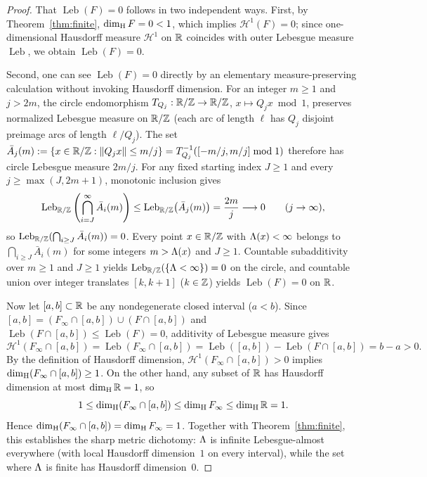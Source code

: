 \begin{proof}
That $\operatorname{Leb}(F)=0$ follows in two independent ways. First, by
Theorem~\ref{thm:finite}, $\dim_{\mathrm{H}} F=0<1$, which implies $\mathcal H^1(F)=0$;
since one-dimensional Hausdorff measure $\mathcal H^1$ on $\mathbb{R}$ coincides with
outer Lebesgue measure $\operatorname{Leb}$, we obtain $\operatorname{Leb}(F)=0$.

Second, one can see $\operatorname{Leb}(F)=0$ directly by an elementary
measure-preserving calculation without invoking Hausdorff dimension. For an
integer $m\ge1$ and $j>2m$, the circle endomorphism $T_{Q_j}:\mathbb{R}/\mathbb{Z}\to\mathbb{R}/\mathbb{Z}$,
$x\mapsto Q_jx\bmod1$, preserves normalized Lebesgue measure on $\mathbb{R}/\mathbb{Z}$ (each
arc of length $\ell$ has $Q_j$ disjoint preimage arcs of length $\ell/Q_j$).
The set $\bar A_j(m):=\{x\in\mathbb{R}/\mathbb{Z}:\|Q_jx\|\le m/j\}=T_{Q_j}^{-1}([-m/j,m/j]\bmod1)$
therefore has circle Lebesgue measure $2m/j$. For any fixed starting index
$J\ge1$ and every $j\ge\max(J,2m+1)$, monotonic inclusion gives
\[
\operatorname{Leb}_{\mathbb{R}/\mathbb{Z}}\left(\bigcap_{i=J}^\infty \bar A_i(m)\right)
\le\operatorname{Leb}_{\mathbb{R}/\mathbb{Z}}\bigl(\bar A_j(m)\bigr)=\frac{2m}{j}\longrightarrow0
\qquad(j\to\infty),
\]
so $\operatorname{Leb}_{\mathbb{R}/\mathbb{Z}}(\bigcap_{i\ge J}\bar A_i(m))=0$. Every point
$x\in\mathbb{R}/\mathbb{Z}$ with $\Lambda(x)<\infty$ belongs to $\bigcap_{i\ge J}\bar A_i(m)$ for
some integers $m>\Lambda(x)$ and $J\ge1$. Countable subadditivity over $m\ge1$ and
$J\ge1$ yields $\operatorname{Leb}_{\mathbb{R}/\mathbb{Z}}(\{\Lambda<\infty\})=0$ on the circle,
and countable union over integer translates $[k,k+1]$ ($k\in\mathbb{Z}$) yields
$\operatorname{Leb}(F)=0$ on $\mathbb{R}$.

Now let $[a,b]\subset\mathbb{R}$ be any nondegenerate closed interval ($a<b$). Since
$[a,b]=(F_\infty\cap[a,b])\cup(F\cap[a,b])$ and $\operatorname{Leb}(F\cap[a,b])\le\operatorname{Leb}(F)=0$,
additivity of Lebesgue measure gives
\[
\mathcal H^1(F_\infty\cap[a,b])=\operatorname{Leb}(F_\infty\cap[a,b])
=\operatorname{Leb}([a,b])-\operatorname{Leb}(F\cap[a,b])=b-a>0.
\]
By the definition of Hausdorff dimension, $\mathcal H^1(F_\infty\cap[a,b])>0$
implies $\dim_{\mathrm{H}}(F_\infty\cap[a,b])\ge1$. On the other hand, any subset of $\mathbb{R}$
has Hausdorff dimension at most $\dim_{\mathrm{H}}\mathbb{R}=1$, so
\[
1\le\dim_{\mathrm{H}}(F_\infty\cap[a,b])\le\dim_{\mathrm{H}} F_\infty\le\dim_{\mathrm{H}}\mathbb{R}=1.
\]
Hence $\dim_{\mathrm{H}}(F_\infty\cap[a,b])=\dim_{\mathrm{H}} F_\infty=1$. Together with
Theorem~\ref{thm:finite}, this establishes the sharp metric dichotomy: $\Lambda$
is infinite Lebesgue-almost everywhere (with local Hausdorff dimension~$1$ on
every interval), while the set where $\Lambda$ is finite has Hausdorff
dimension~$0$.
\end{proof}

